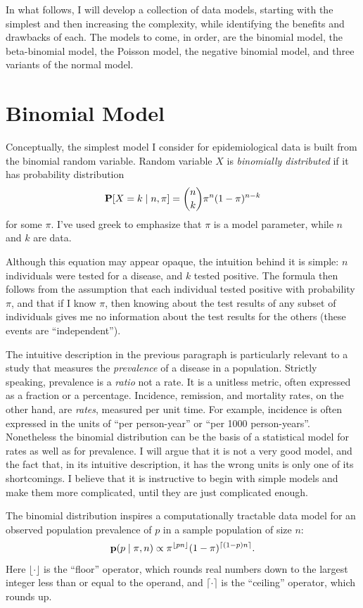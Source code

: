 In what follows, I will develop a collection of data models, starting
with the simplest and then increasing the complexity, while
identifying the benefits and drawbacks of each.  The models to come,
in order, are the binomial model, the beta-binomial model, the Poisson
model, the negative binomial model, and three variants of the normal
model.

\section{Binomial Model}
Conceptually, the simplest model I consider for epidemiological data
is built from the binomial random variable. Random variable $X$ is
\emph{binomially distributed} if it has probability distribution
\[
\mathbf{P}[X=k\;|\; n, \pi] = \binom{n}{k}\pi^n(1-\pi)^{n-k}
\]
for some $\pi$.  I've used greek to emphasize that $\pi$ is a model
parameter, while $n$ and $k$ are data.

Although this equation may appear opaque, the intuition behind it is
simple: $n$ individuals were tested for a disease, and $k$ tested
positive. The formula then follows from the assumption that each
individual tested positive with probability $\pi$, and that if I know
$\pi$, then knowing about the test results of any subset of
individuals gives me no information about the test results for the
others (these events are ``independent'').

The intuitive description in the previous paragraph is particularly
relevant to a study that measures the \emph{prevalence} of a disease
in a population.  Strictly speaking, prevalence is a \emph{ratio} not
a rate.  It is a unitless metric, often expressed as a fraction or a
percentage.  Incidence, remission, and mortality rates, on the other
hand, are \emph{rates}, measured per unit time.  For example,
incidence is often expressed in the units of ``per person-year'' or
``per 1000 person-years''.  Nonetheless the binomial distribution can
be the basis of a statistical model for rates as well as for
prevalence.  I will argue that it is not a very good model, and the
fact that, in its intuitive description, it has the wrong units is
only one of its shortcomings.  I believe that it is instructive to
begin with simple models and make them more complicated, until they
are just complicated enough.

The binomial distribution inspires a computationally tractable
data model for an observed population prevalence of
$p$ in a sample population of size $n$:
\[
\mathbf{p}(p\;|\; \pi, n) \propto \pi^{\lfloor pn \rfloor}(1-\pi)^{\lceil (1-p)n \rceil}.
\]
Here $\lfloor \cdot \rfloor$ is the ``floor'' operator, which rounds
real numbers down to the largest integer less than or equal to the
operand, and $\lceil \cdot \rceil$ is the ``ceiling'' operator, which
rounds up.

